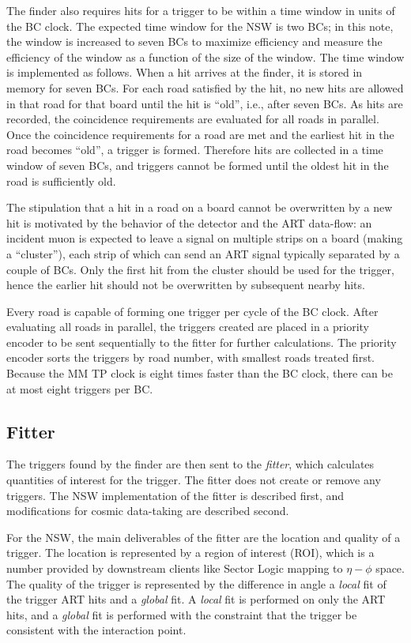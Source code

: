 The finder also requires hits for a trigger to be within a time window in units of the BC clock. The expected time window for the NSW is two BCs; in this note, the window is increased to seven BCs to maximize efficiency and measure the efficiency of the window as a function of the size of the window. The time window is implemented as follows. When a hit arrives at the finder, it is stored in memory for seven BCs. For each road satisfied by the hit, no new hits are allowed in that road for that board until the hit is ``old'', i.e., after seven BCs. As hits are recorded, the coincidence requirements are evaluated for all roads in parallel. Once the coincidence requirements for a road are met and the earliest hit in the road becomes ``old'', a trigger is formed. Therefore hits are collected in a time window of seven BCs, and triggers cannot be formed until the oldest hit in the road is sufficiently old.

The stipulation that a hit in a road on a board cannot be overwritten by a new hit is motivated by the behavior of the detector and the ART data-flow: an incident muon is expected to leave a signal on multiple strips on a board (making a ``cluster''), each strip of which can send an ART signal typically separated by a couple of BCs. Only the first hit from the cluster should be used for the trigger, hence the earlier hit should not be overwritten by subsequent nearby hits. 

Every road is capable of forming one trigger per cycle of the BC clock. After evaluating all roads in parallel, the triggers created are placed in a priority encoder to be sent sequentially to the fitter for further calculations. The priority encoder sorts the triggers by road number, with smallest roads treated first. Because the MM TP clock is eight times faster than the BC clock, there can be at most eight triggers per BC.

\subsection{Fitter}
\label{sec:alg-fitter}

The triggers found by the finder are then sent to the \textit{fitter}, which calculates quantities of interest for the trigger. The fitter does not create or remove any triggers. The NSW implementation of the fitter is described first, and modifications for cosmic data-taking are described second.

For the NSW, the main deliverables of the fitter are the location and quality of a trigger. The location is represented by a region of interest (ROI), which is a number provided by downstream clients like Sector Logic mapping to $\eta-\phi$ space. The quality of the trigger is represented by the difference in angle a \textit{local} fit of the trigger ART hits and a \textit{global} fit. A \textit{local} fit is performed on only the ART hits, and a \textit{global} fit is performed with the constraint that the trigger be consistent with the interaction point.

